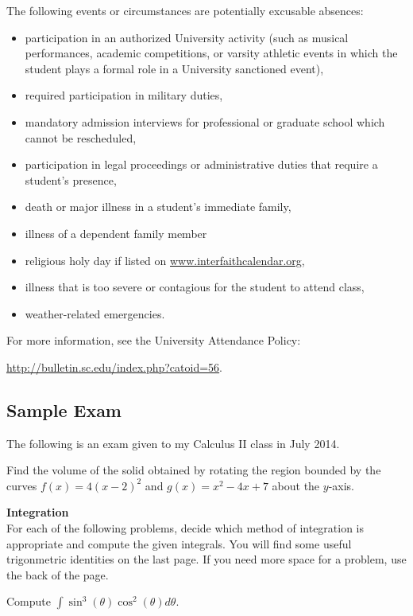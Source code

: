 \documentclass[teaching.portfolio.tex]{subfiles}
\begin{document}
\noindent
The following events or circumstances are potentially excusable absences:
\begin{itemize}
\item
  participation in an authorized University activity (such as musical performances, academic competitions, or varsity athletic events in which the student plays a formal role in a University sanctioned event),
\item
  required participation in military duties,
\item
  mandatory admission interviews for professional or graduate school which cannot be rescheduled,
\item
  participation in legal proceedings or administrative duties that require a student's presence,
\item
  death or major illness in a student’s immediate family,
\item
  illness of a dependent family member
\item
  religious holy day if listed on \url{www.interfaithcalendar.org},
\item
  illness that is too severe or contagious for the student to attend class,
\item
  weather-related emergencies.
\end{itemize}
For more information, see the University Attendance Policy:
\begin{center}
  \url{http://bulletin.sc.edu/index.php?catoid=56}.
\end{center}

\subsection{Sample Exam}
The following is an exam given to my Calculus II class in July 2014.
\begin{thm}
  Find the volume of the solid obtained by rotating the region bounded by the curves $f(x) = 4(x - 2)^2$ and $g(x) = x^2 - 4x + 7$ about the $y$-axis.
\end{thm}

\textbf{Integration}\\

\noindent For each of the following problems, decide which method of integration is appropriate and compute the given integrals.
You will find some useful trigonmetric identities on the last page.
If you need more space for a problem, use the back of the page.

\begin{thm}
  Compute $\displaystyle{\int\sin^3(\theta)\cos^2(\theta)d\theta}$.
\end{thm}
\end{document}
